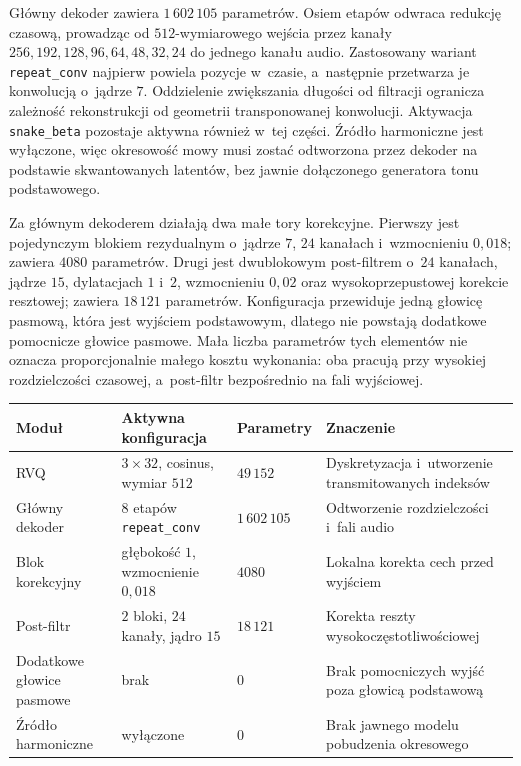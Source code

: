 Główny dekoder zawiera \(1\,602\,105\) parametrów. Osiem etapów odwraca redukcję czasową, prowadząc od \(512\)-wymiarowego wejścia przez kanały \(256,192,128,96,64,48,32,24\) do jednego kanału audio. Zastosowany wariant \texttt{repeat\_conv} najpierw powiela pozycje w~czasie, a~następnie przetwarza je konwolucją o~jądrze \(7\). Oddzielenie zwiększania długości od filtracji ogranicza zależność rekonstrukcji od geometrii transponowanej konwolucji. Aktywacja \texttt{snake\_beta} pozostaje aktywna również w~tej części. Źródło harmoniczne jest wyłączone, więc okresowość mowy musi zostać odtworzona przez dekoder na podstawie skwantowanych latentów, bez jawnie dołączonego generatora tonu podstawowego.

Za głównym dekoderem działają dwa małe tory korekcyjne. Pierwszy jest pojedynczym blokiem rezydualnym o~jądrze \(7\), \(24\) kanałach i~wzmocnieniu \(0{,}018\); zawiera \(4080\) parametrów. Drugi jest dwublokowym post-filtrem o~\(24\) kanałach, jądrze \(15\), dylatacjach \(1\) i~\(2\), wzmocnieniu \(0{,}02\) oraz wysokoprzepustowej korekcie resztowej; zawiera \(18\,121\) parametrów. Konfiguracja przewiduje jedną głowicę pasmową, która jest wyjściem podstawowym, dlatego nie powstają dodatkowe pomocnicze głowice pasmowe. Mała liczba parametrów tych elementów nie oznacza proporcjonalnie małego kosztu wykonania: oba pracują przy wysokiej rozdzielczości czasowej, a~post-filtr bezpośrednio na fali wyjściowej.

\begin{center}
\centering
\small
\setlength{\tabcolsep}{4pt}
\begin{tabular}{>{\raggedright\arraybackslash}p{} >{\raggedright\arraybackslash}p{} >{\raggedright\arraybackslash}p{} >{\raggedright\arraybackslash}p{}}
\toprule
Moduł & Aktywna konfiguracja & Parametry & Znaczenie \\
\midrule
RVQ & \(3\times32\), cosinus, wymiar \(512\) & \(49\,152\) & Dyskretyzacja i~utworzenie transmitowanych indeksów \\
Główny dekoder & \(8\) etapów \texttt{repeat\_conv} & \(1\,602\,105\) & Odtworzenie rozdzielczości i~fali audio \\
Blok korekcyjny & głębokość \(1\), wzmocnienie \(0{,}018\) & \(4080\) & Lokalna korekta cech przed wyjściem \\
Post-filtr & \(2\) bloki, \(24\) kanały, jądro \(15\) & \(18\,121\) & Korekta reszty wysokoczęstotliwościowej \\
Dodatkowe głowice pasmowe & brak & \(0\) & Brak pomocniczych wyjść poza głowicą podstawową \\
Źródło harmoniczne & wyłączone & \(0\) & Brak jawnego modelu pobudzenia okresowego \\
\bottomrule
\end{tabular}
\label{tab:kwantyzer-dekoder-korekcja}
\end{center}


